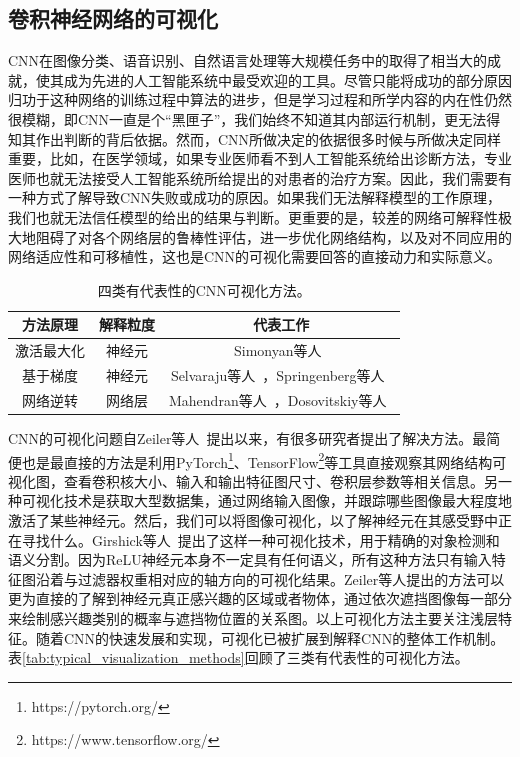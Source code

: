 \subsection{卷积神经网络的可视化}\label{subsec:visulization_methods}
CNN在图像分类、语音识别、自然语言处理等大规模任务中的取得了相当大的成就，使其成为先进的人工智能系统中最受欢迎的工具。尽管只能将成功的部分原因归功于这种网络的训练过程中算法的进步，但是学习过程和所学内容的内在性仍然很模糊，即CNN一直是个“黑匣子”，我们始终不知道其内部运行机制，更无法得知其作出判断的背后依据。然而，CNN所做决定的依据很多时候与所做决定同样重要，比如，在医学领域，如果专业医师看不到人工智能系统给出诊断方法，专业医师也就无法接受人工智能系统所给提出的对患者的治疗方案。因此，我们需要有一种方式了解导致CNN失败或成功的原因。如果我们无法解释模型的工作原理，我们也就无法信任模型的给出的结果与判断。更重要的是，较差的网络可解释性极大地阻碍了对各个网络层的鲁棒性评估，进一步优化网络结构，以及对不同应用的网络适应性和可移植性，这也是CNN的可视化需要回答的直接动力和实际意义。
\begin{table}[h]
	\centering
	\caption[四类有代表性的CNN可视化方法]{四类有代表性的CNN可视化方法。}
	\label{tab:typical_visualization_methods}
	\begin{tabular}{c|c|c}
		\toprule[2pt]
		方法原理 & 解释粒度 & 代表工作 \\ \midrule[2pt]
		激活最大化 & 神经元  & Simonyan等人~\cite{simonyan2013deep}  \\\hline
		基于梯度 &  神经元 & Selvaraju等人~\cite{selvaraju2017grad}，Springenberg等人~\cite{springenberg2014striving} \\  \hline
		网络逆转 & 网络层 &Mahendran等人~\cite{mahendran2015understanding, mahendran2016visualizing}，Dosovitskiy等人~\cite{dosovitskiy2016inverting}\\
		\bottomrule[2pt]
	\end{tabular}
	\label{tab:four_visulization_types}
\end{table}
CNN的可视化问题自Zeiler等人~\cite{zeiler2014visualizing}提出以来，有很多研究者提出了解决方法。最简便也是最直接的方法是利用PyTorch\footnote{https://pytorch.org/}、TensorFlow\footnote{https://www.tensorflow.org/}等工具直接观察其网络结构可视化图，查看卷积核大小、输入和输出特征图尺寸、卷积层参数等相关信息。另一种可视化技术是获取大型数据集，通过网络输入图像，并跟踪哪些图像最大程度地激活了某些神经元。然后，我们可以将图像可视化，以了解神经元在其感受野中正在寻找什么。Girshick等人~\cite{girshick2014rich}提出了这样一种可视化技术，用于精确的对象检测和语义分割。因为ReLU神经元本身不一定具有任何语义，所有这种方法只有输入特征图沿着与过滤器权重相对应的轴方向的可视化结果。Zeiler等人提出的方法可以更为直接的了解到神经元真正感兴趣的区域或者物体，通过依次遮挡图像每一部分来绘制感兴趣类别的概率与遮挡物位置的关系图。以上可视化方法主要关注浅层特征。随着CNN的快速发展和实现，可视化已被扩展到解释CNN的整体工作机制。表\ref{tab:typical_visualization_methods}回顾了三类有代表性的可视化方法。
